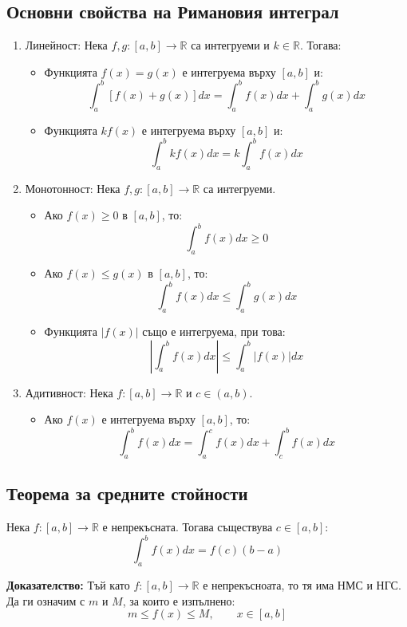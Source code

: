 \documentclass{article}
\renewcommand{\\}{\newline}
\newcommand{\doc}{\textbf{Доказателство: }}
\begin{document}
\subsection{Основни свойства на Римановия интеграл}
\begin{enumerate}
  \item Линейност: Нека \(f, g : [a, b] \to \mathbb{R}\) са интегруеми и \(k \in \mathbb{R}\). Тогава:
    \begin{itemize}
      \item Функцията \(f(x) = g(x)\) е интегруема върху \([a, b]\) и: \[
          \int_{a}^{b}[f(x)+g(x)]dx = \int_{a}^{b}f(x)dx + \int_{a}^{b}g(x)dx
      \] 
    \item Функцията \(kf(x)\) е интегруема върху \([a,b]\) и: \[
      \int_{a}^{b}kf(x)dx = k\int_{a}^{b}f(x)dx
    \]   
    \end{itemize}
  \item Монотонност: Нека \(f, g: [a, b]\to \mathbb{R}\) са интегруеми. \begin{itemize}
      \item Ако \(f(x) \geq 0\) в \([a, b]\), то: \[
        \int_{a}^{b}f(x)dx \geq 0
      \]   
    \item Ако \(f(x) \leq g(x)\) в \([a, b]\), то: \[
      \int_{a}^{b}f(x)dx \leq \int_{a}^{b}g(x)dx
    \]
  \item Функцията \(\left|f(x)\right|\) също е интегруема, при това: \[
    \left|\int_{a}^{b}f(x)dx\right| \leq \int_{a}^{b}\left|f(x)\right|dx
  \]  
  \end{itemize} 
\item Адитивност: Нека \(f:[a, b] \to \mathbb{R}\) и \(c \in (a, b)\). 
  \begin{itemize}
      \item Ако \(f(x)\) е интегруема върху \([a, b]\), то: \[
      \int_{a}^{b}f(x)dx = \int_{a}^{c}f(x)dx + \int_{c}^{b}f(x)dx \]     
  \end{itemize}
\end{enumerate}

\subsection{Теорема за средните стойности} Нека \(f: [a, b] \to \mathbb{R}\) е непрекъсната. Тогава съществува \(c \in [a, b]\): \[
  \int_{a}^{b}f(x)dx = f(c)(b-a)
\]  

\doc Тъй като \(f:[a, b] \to \mathbb{R}\) е непрекъсноата, то тя има НМС и НГС. Да ги означим с \(m\) и \(M\), за които е изпълнено: \[
  m \leq f(x) \leq M, \qquad x \in [a, b]
\]    
\end{document}
